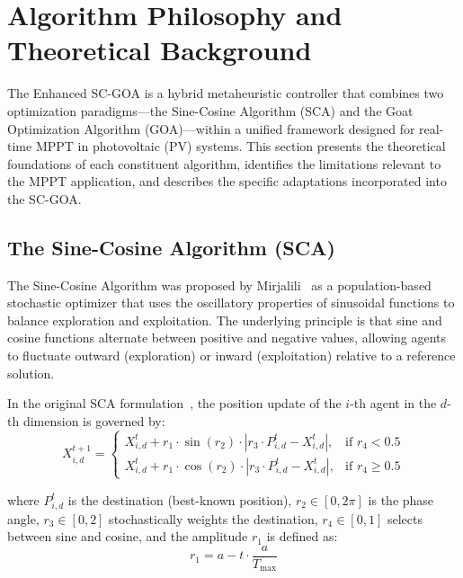 \documentclass[a4paper, 12pt]{article}
\begin{document}
\section{Algorithm Philosophy and Theoretical Background}
\label{sec:philosophy}

The Enhanced SC-GOA is a hybrid metaheuristic controller that combines two optimization paradigms---the Sine-Cosine Algorithm (SCA) and the Goat Optimization Algorithm (GOA)---within a unified framework designed for real-time MPPT in photovoltaic (PV) systems. This section presents the theoretical foundations of each constituent algorithm, identifies the limitations relevant to the MPPT application, and describes the specific adaptations incorporated into the SC-GOA.


\subsection{The Sine-Cosine Algorithm (SCA)}
\label{subsec:sca_philosophy}

The Sine-Cosine Algorithm was proposed by Mirjalili~\cite{mirjalili2016sca} as a population-based stochastic optimizer that uses the oscillatory properties of sinusoidal functions to balance exploration and exploitation. The underlying principle is that sine and cosine functions alternate between positive and negative values, allowing agents to fluctuate outward (exploration) or inward (exploitation) relative to a reference solution.

In the original SCA formulation~\cite{mirjalili2016sca}, the position update of the $i$-th agent in the $d$-th dimension is governed by:
\begin{equation}
    X_{i,d}^{t+1} =
    \begin{cases}
        X_{i,d}^{t} + r_1 \cdot \sin(r_2) \cdot |r_3 \cdot P_{i,d}^{t} - X_{i,d}^{t}|, & \text{if } r_4 < 0.5 \\[4pt]
        X_{i,d}^{t} + r_1 \cdot \cos(r_2) \cdot |r_3 \cdot P_{i,d}^{t} - X_{i,d}^{t}|, & \text{if } r_4 \geq 0.5
    \end{cases}
    \label{eq:sca_original}
\end{equation}

where $P_{i,d}^{t}$ is the destination (best-known position), $r_2 \in [0, 2\pi]$ is the phase angle, $r_3 \in [0, 2]$ stochastically weights the destination, $r_4 \in [0, 1]$ selects between sine and cosine, and the amplitude $r_1$ is defined as:
\begin{equation}
    r_1 = a - t \cdot \frac{a}{T_{\max}}
    \label{eq:sca_r1_original}
\end{equation}
\end{document}
